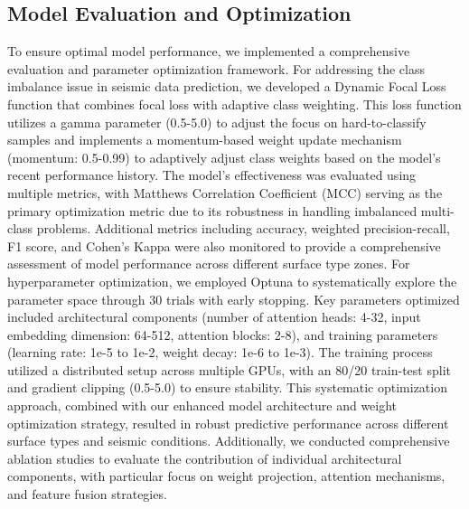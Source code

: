 \documentclass[fleqn,10pt]{wlscirep_mdpi_style}
\begin{document}
\subsection{Model Evaluation and Optimization}
To ensure optimal model performance, we implemented a comprehensive evaluation and parameter optimization framework. For addressing the class imbalance issue in seismic data prediction, we developed a Dynamic Focal Loss function that combines focal loss with adaptive class weighting. This loss function utilizes a gamma parameter (0.5-5.0) to adjust the focus on hard-to-classify samples and implements a momentum-based weight update mechanism (momentum: 0.5-0.99) to adaptively adjust class weights based on the model's recent performance history.
The model's effectiveness was evaluated using multiple metrics, with Matthews Correlation Coefficient (MCC) \cite{matthewsComparisonPredictedObserved1975} serving as the primary optimization metric due to its robustness in handling imbalanced multi-class problems. Additional metrics including accuracy, weighted precision-recall, F1 score, and Cohen's Kappa \cite{cohenCoefficientAgreementNominal1960} were also monitored to provide a comprehensive assessment of model performance across different surface type zones.
For hyperparameter optimization, we employed Optuna \cite{akibaOptunaNextgenerationHyperparameter2019} to systematically explore the parameter space through 30 trials with early stopping. Key parameters optimized included architectural components (number of attention heads: 4-32, input embedding dimension: 64-512, attention blocks: 2-8), and training parameters (learning rate: 1e-5 to 1e-2, weight decay: 1e-6 to 1e-3). The training process utilized a distributed setup across multiple GPUs, with an 80/20 train-test split and gradient clipping (0.5-5.0) to ensure stability. This systematic optimization approach, combined with our enhanced model architecture and weight optimization strategy, resulted in robust predictive performance across different surface types and seismic conditions.
Additionally, we conducted comprehensive ablation studies to evaluate the contribution of individual architectural components, with particular focus on weight projection, attention mechanisms, and feature fusion strategies.
\end{document}

